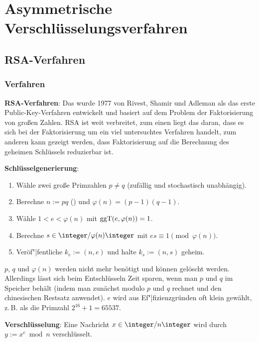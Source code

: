 \section{%
    Asymmetrische Verschlüsselungsverfahren%
}

\subsection{%
    RSA-Verfahren%
}

\subsubsection{%
    Verfahren%
}

\textbf{RSA-Verfahren}:
Das  wurde 1977 von Rivest, Shamir und Adleman als das erste
Public-Key-Verfahren entwickelt und basiert auf dem Problem der Faktorisierung von großen Zahlen.
RSA ist weit verbreitet, zum einen liegt das daran, dass es sich bei der Faktorisierung
um ein viel untersuchtes Verfahren handelt, zum anderen kann gezeigt werden,
dass Faktorisierung auf die Berechnung des geheimen Schlüssels reduzierbar ist.

\textbf{Schlüsselgenerierung}:
\begin{enumerate}
    \item
    Wähle zwei große Primzahlen $p \not= q$ (zufällig und stochastisch unabhängig).
    
    \item
    Berechne $n := pq$ () und $\varphi(n) = (p - 1)(q - 1)$.
    
    \item
    Wähle $1 < e < \varphi(n)$ mit $\operatorname{ggT}(e, \varphi(n)) = 1$.
    
    \item
    Berechne $s \in \integer/\varphi(n)\integer$ mit $es \equiv 1 \pmod{\varphi(n)}$.
    
    \item
    Veröf"|fentliche $k_e := (n, e)$ und halte $k_s := (n, s)$ geheim.
\end{enumerate}
$p$, $q$ und $\varphi(n)$ werden nicht mehr benötigt und können gelöscht werden.
Allerdings lässt sich beim Entschlüsseln Zeit sparen, wenn man $p$ und $q$ im Speicher behält
(indem man zunächst modulo $p$ und $q$ rechnet und den chinesischen Restsatz anwendet).
$e$ wird aus Ef"|fizienzgründen oft klein gewählt, z.\,B. als die Primzahl $2^{16} + 1 = 65537$.

\textbf{Verschlüsselung}:
Eine Nachricht $x \in \ZnZ$ wird durch $y := x^e \bmod n$ verschlüsselt.

